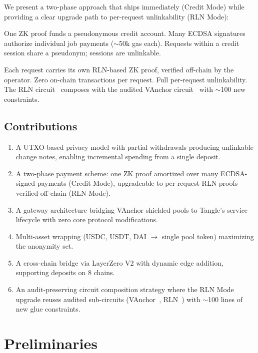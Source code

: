 \documentclass[11pt,a4paper]{article}
\theoremstyle{definition}
\begin{document}
We present a two-phase approach that ships immediately (Credit Mode) while providing a clear upgrade path to per-request unlinkability (RLN Mode):

\begin{description}[nosep, leftmargin=1.5cm]
  \item[Credit Mode (deployed):] One ZK proof funds a pseudonymous credit account. Many ECDSA signatures authorize individual job payments ($\sim$50k gas each). Requests within a credit session share a pseudonym; sessions are unlinkable.
  \item[RLN Mode (planned):] Each request carries its own RLN-based ZK proof, verified off-chain by the operator. Zero on-chain transactions per request. Full per-request unlinkability. The RLN circuit~\cite{rln} composes with the audited VAnchor circuit~\cite{webb,veridise} with $\sim$100 new constraints.
\end{description}

\subsection{Contributions}

\begin{enumerate}[nosep]
  \item A UTXO-based privacy model with partial withdrawals producing unlinkable change notes, enabling incremental spending from a single deposit.
  \item A two-phase payment scheme: one ZK proof amortized over many ECDSA-signed payments (Credit Mode), upgradeable to per-request RLN proofs verified off-chain (RLN Mode).
  \item A gateway architecture bridging VAnchor shielded pools to Tangle's service lifecycle with zero core protocol modifications.
  \item Multi-asset wrapping (USDC, USDT, DAI $\to$ single pool token) maximizing the anonymity set.
  \item A cross-chain bridge via LayerZero V2 with dynamic edge addition, supporting deposits on 8 chains.
  \item An audit-preserving circuit composition strategy where the RLN Mode upgrade reuses audited sub-circuits (VAnchor~\cite{veridise}, RLN~\cite{rlnaudit}) with $\sim$100 lines of new glue constraints.
\end{enumerate}

\section{Preliminaries}
\end{document}
